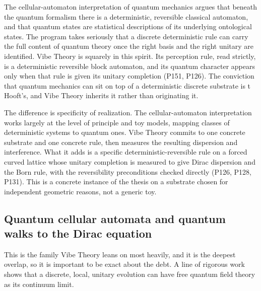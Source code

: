 The cellular-automaton interpretation of quantum mechanics \cite{thooft2014} argues that beneath the quantum
formalism there is a deterministic, reversible classical automaton, and that quantum states are statistical
descriptions of its underlying ontological states. The program takes seriously that a discrete deterministic
rule can carry the full content of quantum theory once the right basis and the right unitary are identified.
Vibe Theory is squarely in this spirit. Its perception rule, read strictly, is a deterministic reversible
block automaton, and its quantum character appears only when that rule is given its unitary completion (P151,
P126). The conviction that quantum mechanics can sit on top of a deterministic discrete substrate is t
Hooft's, and Vibe Theory inherits it rather than originating it.

The difference is specificity of realization. The cellular-automaton interpretation works largely at the level
of principle and toy models, mapping classes of deterministic systems to quantum ones. Vibe Theory commits to
one concrete substrate and one concrete rule, then measures the resulting dispersion and interference. What it
adds is a specific deterministic-reversible rule on a forced curved lattice whose unitary completion is
measured to give Dirac dispersion and the Born rule, with the reversibility preconditions checked directly
(P126, P128, P131). This is a concrete instance of the thesis on a substrate chosen for independent geometric
reasons, not a generic toy.

\subsection{Quantum cellular automata and quantum walks to the Dirac equation}

This is the family Vibe Theory leans on most heavily, and it is the deepest overlap, so it is important to be
exact about the debt. A line of rigorous work shows that a discrete, local, unitary evolution can have free
quantum field theory as its continuum limit.

